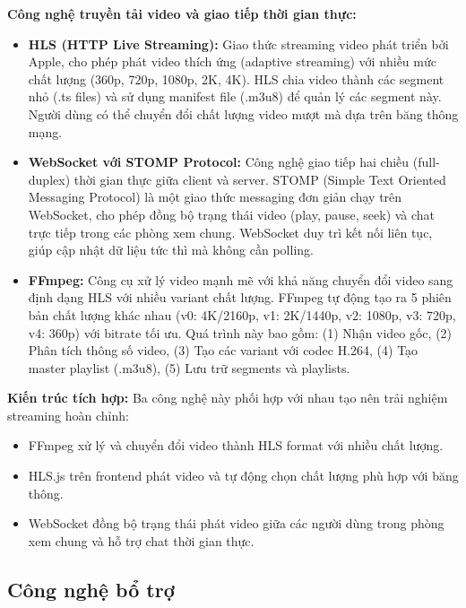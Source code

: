 \textbf{Công nghệ truyền tải video và giao tiếp thời gian thực:}

\begin{itemize}
	\item \textbf{HLS (HTTP Live Streaming):} Giao thức streaming video phát triển bởi Apple, cho phép phát video thích ứng (adaptive streaming) với nhiều mức chất lượng (360p, 720p, 1080p, 2K, 4K). HLS chia video thành các segment nhỏ (.ts files) và sử dụng manifest file (.m3u8) để quản lý các segment này. Người dùng có thể chuyển đổi chất lượng video mượt mà dựa trên băng thông mạng.

	\item \textbf{WebSocket với STOMP Protocol:} Công nghệ giao tiếp hai chiều (full-duplex) thời gian thực giữa client và server. STOMP (Simple Text Oriented Messaging Protocol) là một giao thức messaging đơn giản chạy trên WebSocket, cho phép đồng bộ trạng thái video (play, pause, seek) và chat trực tiếp trong các phòng xem chung. WebSocket duy trì kết nối liên tục, giúp cập nhật dữ liệu tức thì mà không cần polling.

	\item \textbf{FFmpeg:} Công cụ xử lý video mạnh mẽ với khả năng chuyển đổi video sang định dạng HLS với nhiều variant chất lượng. FFmpeg tự động tạo ra 5 phiên bản chất lượng khác nhau (v0: 4K/2160p, v1: 2K/1440p, v2: 1080p, v3: 720p, v4: 360p) với bitrate tối ưu. Quá trình này bao gồm: (1) Nhận video gốc, (2) Phân tích thông số video, (3) Tạo các variant với codec H.264, (4) Tạo master playlist (.m3u8), (5) Lưu trữ segments và playlists.
\end{itemize}

\textbf{Kiến trúc tích hợp:}
Ba công nghệ này phối hợp với nhau tạo nên trải nghiệm streaming hoàn chỉnh:
\begin{itemize}
	\item FFmpeg xử lý và chuyển đổi video thành HLS format với nhiều chất lượng.
	\item HLS.js trên frontend phát video và tự động chọn chất lượng phù hợp với băng thông.
	\item WebSocket đồng bộ trạng thái phát video giữa các người dùng trong phòng xem chung và hỗ trợ chat thời gian thực.
\end{itemize}

\subsection{Công nghệ bổ trợ}

